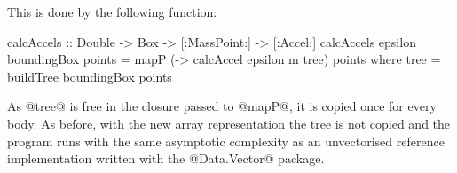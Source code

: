 \noindent
This is done by the following function:
\begin{small}
\begin{code}
 calcAccels :: Double -> Box -> [:MassPoint:] -> [:Accel:]
 calcAccels epsilon boundingBox points
  = mapP (\m -> calcAccel epsilon m tree) points
  where tree = buildTree boundingBox points
\end{code}
\end{small}
As @tree@ is free in the closure passed to @mapP@, it is copied once for every body. As before, with the new array representation the tree is not copied and the program runs with the same asymptotic complexity as an unvectorised reference implementation written with the @Data.Vector@ package.


